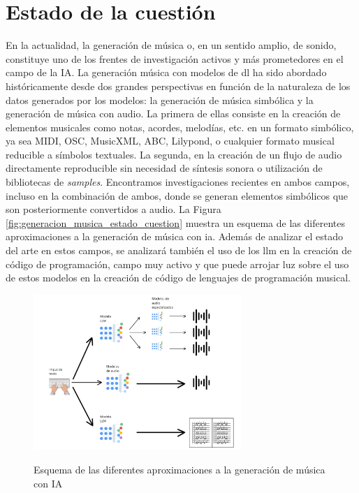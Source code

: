 \section{Estado de la cuestión}
\label{chap:estado_cuestion}


En la actualidad, la generación de música o, en un sentido amplio, de sonido, constituye uno de los frentes de investigación activos y más prometedores en el campo de la IA. La generación música con modelos de \gls{dl} ha sido abordado históricamente desde dos grandes perspectivas en función de la naturaleza de los datos generados por los modelos: la generación de música simbólica y la generación de música con audio. La primera de ellas consiste en la creación de elementos musicales como notas, acordes, melodías, etc. en un formato simbólico, ya sea MIDI, OSC, MusicXML, ABC, Lilypond, o cualquier formato musical reducible a símbolos textuales. La segunda, en la creación de un flujo de audio directamente reproducible sin necesidad de síntesis sonora o utilización de bibliotecas de \emph{samples}. Encontramos investigaciones recientes en ambos campos, incluso en la combinación de ambos, donde se generan elementos simbólicos que son posteriormente convertidos a audio. La Figura \ref{fig:generacion_musica_estado_cuestion} muestra un esquema de las diferentes aproximaciones a la generación de música con \gls{ia}. Además de analizar el estado del arte en estos campos, se analizará también el uso de los \gls{llm} en la creación de código de programación, campo muy activo y que puede arrojar luz sobre el uso de estos modelos en la creación de código de lenguajes de programación musical.

\begin{figure}[H]
    \caption{Esquema de las diferentes aproximaciones a la generación de música con IA}
    \centering
    \includegraphics[width=0.7\textwidth]{./figuras/generacion_musica_estado_cuestion.png}
    \source{\propio}
    \label{fig:generacion_musica}
\end{figure}

